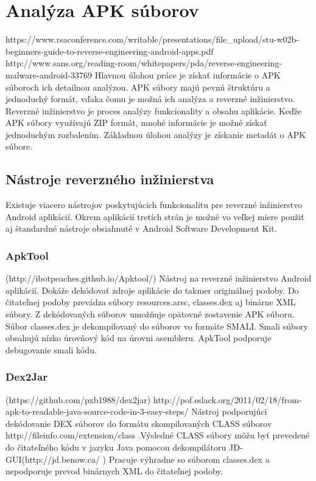 \chapter{Analýza APK súborov}
https://www.rsaconference.com/writable/presentations/file\_upload/stu-w02b-beginners-guide-to-reverse-engineering-android-apps.pdf
http://www.sans.org/reading-room/whitepapers/pda/reverse-engineering-malware-android-33769
Hlavnou úlohou práce je získať informácie o APK súboroch ich detailnou analýzou. APK súbory majú pevnú štruktúru a jednoduchý formát, vďaka čomu je možná ich analýza a reverzné inžinierstvo. Reverzné inžinierstvo je proces analýzy funkcionality a obsahu aplikácie. Keďže APK súbory využívajú ZIP formát, mnohé informácie je možné získať jednoduchým rozbalením. Základnou úlohou analýzy je získanie metadát o APK súbore.

\section{Nástroje reverzného inžinierstva}

Existuje viacero nástrojov poskytujúcich funkcionalitu pre reverzné inžinierstvo Android aplikácií. Okrem aplikácií tretích strán je možné vo veľkej miere použiť aj štandardné nástroje obsiahnuté v Android Software Development Kit.

\subsection{ApkTool}
\label{ApkTool}
 (http://ibotpeaches.github.io/Apktool/)
Nástroj na reverzné inžinierstvo Android aplikácií. Dokáže dekódovať zdroje aplikácie do takmer originálnej podoby. Do čitateľnej podoby prevádza súbory resources.arsc, classes.dex aj binárne XML súbory. Z dekódovaných súborov umožňuje opätovné zostavenie APK súboru. Súbor classes.dex je dekompilovaný do súborov vo formáte SMALI. Smali súbory obsahujú nízko úrovňový kód na úrovni asembleru. ApkTool podporuje debugovanie smali kódu.

\subsection{Dex2Jar}
(https://github.com/pxb1988/dex2jar) http://pof.eslack.org/2011/02/18/from-apk-to-readable-java-source-code-in-3-easy-steps/
Nástroj podporujúci dekódovanie DEX súborov do formátu skompilovaných CLASS súborov http://fileinfo.com/extension/class .Výsledné CLASS súbory môžu byť prevedené do čitateľného kódu v jazyku Java pomocou dekompilátoru JD-GUI(http://jd.benow.ca/ ) Pracuje výhradne so súborom classes.dex a nepodporuje prevod binárnych XML do čitateľnej podoby.

